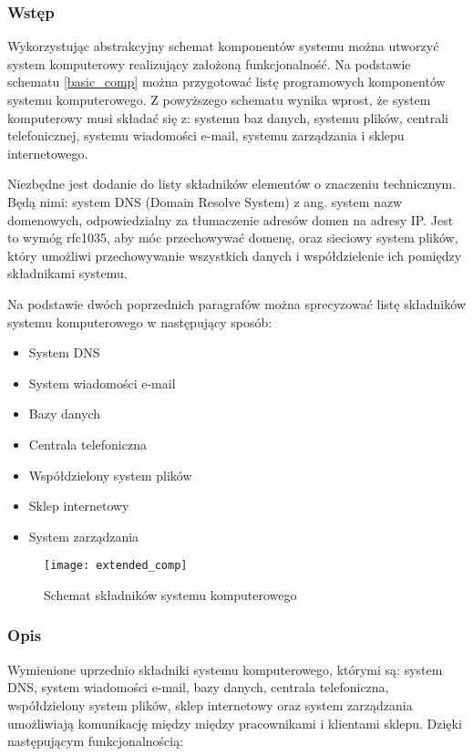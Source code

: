 \subsubsection{Wstęp}
				\par Wykorzystując abstrakcyjny schemat komponentów systemu można utworzyć system komputerowy realizujący założoną funkcjonalność. Na podstawie schematu \ref{basic_comp} można przygotować listę programowych komponentów systemu komputerowego. Z powyższego schematu wynika wprost, że system komputerowy musi składać się z: systemu baz danych, systemu plików, centrali telefonicznej, systemu wiadomości e-mail, systemu zarządzania i sklepu internetowego.
				\par Niezbędne jest dodanie do listy składników elementów o znaczeniu technicznym. Będą nimi: system DNS (Domain Resolve System) z ang. system nazw domenowych, odpowiedzialny za tłumaczenie adresów domen na adresy IP. Jest to wymóg rfc1035, aby móc przechowywać domenę, oraz sieciowy system plików, który umożliwi przechowywanie wszystkich danych i współdzielenie ich pomiędzy składnikami systemu.
				
				\par Na podstawie dwóch poprzednich paragrafów można sprecyzować listę składników systemu komputerowego w następujący sposób:
				\begin{itemize}
					\item System DNS
					\item System wiadomości e-mail
					\item Bazy danych
					\item Centrala telefoniczna
					\item Współdzielony system plików
					\item Sklep internetowy
					\item System zarządzania
				\end{itemize}
				
				\begin{figure}[H]
					\centering
					\texttt{[image: extended\_comp]}
					\caption{Schemat składników systemu komputerowego}
					\label{extended_comp}
				\end{figure}
			
			\subsubsection{Opis}
				\par Wymienione uprzednio składniki systemu komputerowego, którymi są: system DNS, system wiadomości e-mail, bazy danych, centrala telefoniczna, współdzielony system plików, sklep internetowy oraz system zarządzania umożliwiają komunikację między między pracownikami i klientami sklepu. Dzięki następującym funkcjonalnością:
				
